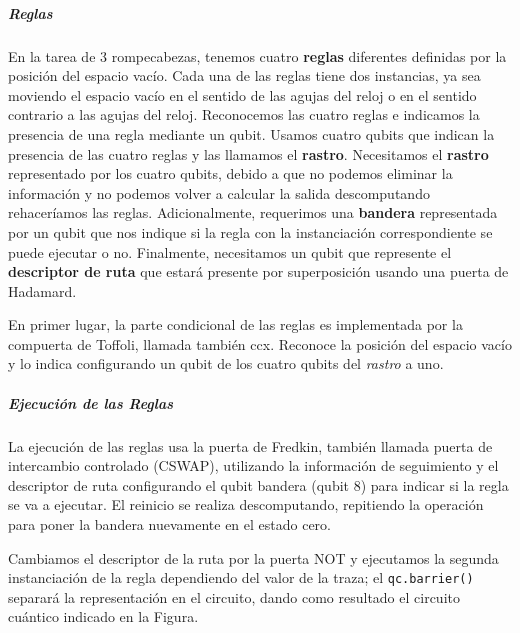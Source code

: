 \documentclass[11pt]{article}
\begin{document}
    \hypertarget{reglas}{%
\subparagraph{Reglas}\label{reglas}}

En la tarea de 3 rompecabezas, tenemos cuatro \textbf{reglas} diferentes
definidas por la posición del espacio vacío. Cada una de las reglas
tiene dos instancias, ya sea moviendo el espacio vacío en el sentido de
las agujas del reloj o en el sentido contrario a las agujas del reloj.
Reconocemos las cuatro reglas e indicamos la presencia de una regla
mediante un qubit. Usamos cuatro qubits que indican la presencia de las
cuatro reglas y las llamamos el \textbf{rastro}. Necesitamos el
\textbf{rastro} representado por los cuatro qubits, debido a que no
podemos eliminar la información y no podemos volver a calcular la salida
descomputando rehaceríamos las reglas. Adicionalmente, requerimos una
\textbf{bandera} representada por un qubit que nos indique si la regla
con la instanciación correspondiente se puede ejecutar o no. Finalmente,
necesitamos un qubit que represente el \textbf{descriptor de ruta} que
estará presente por superposición usando una puerta de Hadamard.

En primer lugar, la parte condicional de las reglas es implementada por
la compuerta de Toffoli, llamada también ccx. Reconoce la posición del
espacio vacío y lo indica configurando un qubit de los cuatro qubits del
\emph{rastro} a uno.

    \hypertarget{ejecuciuxf3n-de-las-reglas}{%
\subparagraph{Ejecución de las
Reglas}\label{ejecuciuxf3n-de-las-reglas}}

La ejecución de las reglas usa la puerta de Fredkin, también llamada
puerta de intercambio controlado (CSWAP), utilizando la información de
seguimiento y el descriptor de ruta configurando el qubit bandera (qubit
8) para indicar si la regla se va a ejecutar. El reinicio se realiza
descomputando, repitiendo la operación para poner la bandera nuevamente
en el estado cero.

Cambiamos el descriptor de la ruta por la puerta NOT y ejecutamos la
segunda instanciación de la regla dependiendo del valor de la traza; el
\texttt{qc.barrier()} separará la representación en el circuito, dando
como resultado el circuito cuántico indicado en la Figura.
\end{document}
